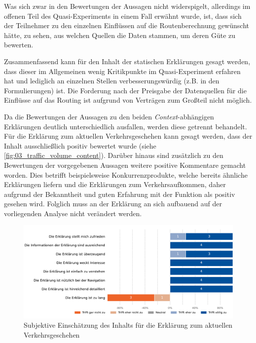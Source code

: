 Was sich zwar in den Bewertungen der Aussagen nicht widerspigelt, allerdings im offenen Teil des Quasi-Experiments in einem Fall erwähnt wurde, ist, dass sich der Teilnehmer zu den einzelnen Einflüssen auf die Routenberechnung gewünscht hätte, zu sehen, aus welchen Quellen die Daten stammen, um deren Güte zu bewerten.

Zusammenfassend kann für den Inhalt der statischen Erklärungen gesagt werden, dass dieser im Allgemeinen wenig Kritikpunkte im Quasi-Experiment erfahren hat und lediglich an einzelnen Stellen verbesserungswürdig (z.B. in den Formulierungen) ist. Die Forderung nach der Preisgabe der Datenquellen für die Einflüsse auf das Routing ist aufgrund von Verträgen zum Großteil nicht möglich. 

\bigskip

Da die Bewertungen der Aussagen zu den beiden \textit{Context}-abhängigen Erklärungen deutlich unterschiedlich ausfallen, werden diese getrennt behandelt. Für die Erklärung zum aktuellen Verkehrsgeschehen kann gesagt werden, dass der Inhalt ausschließlich positiv bewertet wurde (siehe \autoref{fig:03_traffic_volume_content}). Darüber hinaus sind zusätzlich zu den Bewertungen der vorgegebenen Aussagen weitere positive Kommentare gemacht worden. Dies betrifft beispielsweise Konkurrenzprodukte, welche bereits ähnliche Erklärungen liefern und die Erklärungen zum Verkehrsaufkommen, daher aufgrund der Bekanntheit und guten Erfahrung mit der Funktion als positiv gesehen wird. Folglich muss an der Erklärung an sich aufbauend auf der vorliegenden Analyse nicht verändert werden.

\begin{figure}[htb!]
    \centering
    \includegraphics[width=\textwidth]{contents/06_model_evaluation/02_evaluation/res/qualitativeFeedback-03_traffic_volume_content.pdf}
    \caption{Subjektive Einschätzung des Inhalts für die Erklärung zum aktuellen Verkehrsgeschehen}
    \label{fig:03_traffic_volume_content}
\end{figure}

